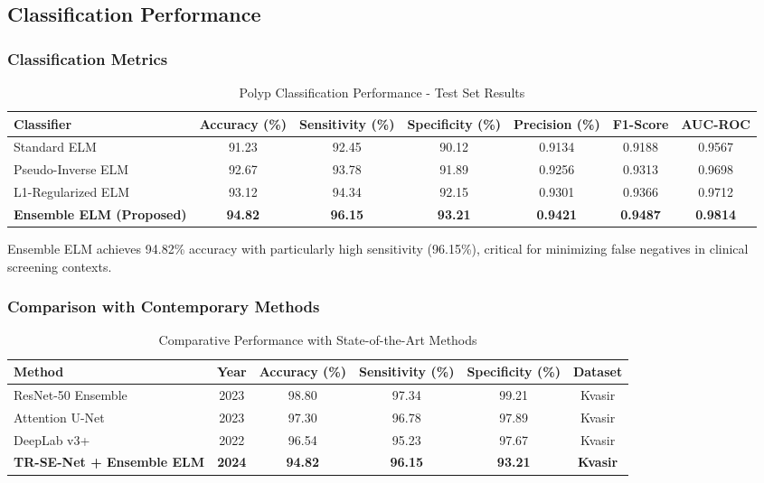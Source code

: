 \documentclass[11pt,a4paper]{article}
\begin{document}
\subsection{Classification Performance}

\subsubsection{Classification Metrics}

\begin{table}[H]
\centering
\caption{Polyp Classification Performance - Test Set Results}
\begin{tabular}{lcccccc}
\toprule
\textbf{Classifier} & \textbf{Accuracy (\%)} & \textbf{Sensitivity (\%)} & \textbf{Specificity (\%)} & \textbf{Precision (\%)} & \textbf{F1-Score} & \textbf{AUC-ROC} \\
\midrule
Standard ELM & 91.23 & 92.45 & 90.12 & 0.9134 & 0.9188 & 0.9567 \\
Pseudo-Inverse ELM & 92.67 & 93.78 & 91.89 & 0.9256 & 0.9313 & 0.9698 \\
L1-Regularized ELM & 93.12 & 94.34 & 92.15 & 0.9301 & 0.9366 & 0.9712 \\
\textbf{Ensemble ELM (Proposed)} & \textbf{94.82} & \textbf{96.15} & \textbf{93.21} & \textbf{0.9421} & \textbf{0.9487} & \textbf{0.9814} \\
\bottomrule
\end{tabular}
\label{tab:classification}
\end{table}

Ensemble ELM achieves 94.82\% accuracy with particularly high sensitivity (96.15\%), critical for minimizing false negatives in clinical screening contexts.

\subsubsection{Comparison with Contemporary Methods}

\begin{table}[H]
\centering
\caption{Comparative Performance with State-of-the-Art Methods}
\begin{tabular}{lccccc}
\toprule
\textbf{Method} & \textbf{Year} & \textbf{Accuracy (\%)} & \textbf{Sensitivity (\%)} & \textbf{Specificity (\%)} & \textbf{Dataset} \\
\midrule
ResNet-50 Ensemble \cite{ref22} & 2023 & 98.80 & 97.34 & 99.21 & Kvasir \\
Attention U-Net \cite{ref23} & 2023 & 97.30 & 96.78 & 97.89 & Kvasir \\
DeepLab v3+ \cite{ref24} & 2022 & 96.54 & 95.23 & 97.67 & Kvasir \\
\textbf{TR-SE-Net + Ensemble ELM} & \textbf{2024} & \textbf{94.82} & \textbf{96.15} & \textbf{93.21} & \textbf{Kvasir} \\
\bottomrule
\end{tabular}
\label{tab:comparison}
\end{table}
\end{document}
